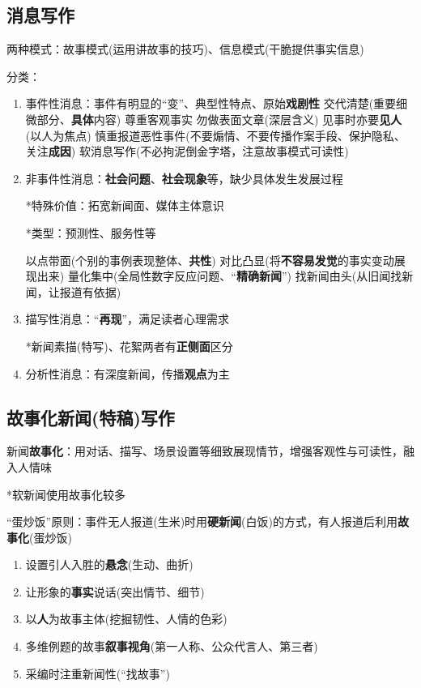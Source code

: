 \documentclass[a4paper,UTF8]{ctexart}
\begin{document}
\subsection{消息写作}

两种模式：故事模式(运用讲故事的技巧)、信息模式(干脆提供事实信息)

分类：
\begin{enumerate}
	\item 事件性消息：事件有明显的“变”、典型性特点、原始\textbf{戏剧性}
	\subitem 交代清楚(重要细微部分、\textbf{具体}内容)
	\subitem 尊重客观事实
	\subitem 勿做表面文章(深层含义)
	\subitem 见事时亦要\textbf{见人}(以人为焦点)
	\subitem 慎重报道恶性事件(不要煽情、不要传播作案手段、保护隐私、关注\textbf{成因})
	\subitem 软消息写作(不必拘泥倒金字塔，注意故事模式可读性)
	
	\item 非事件性消息：\textbf{社会问题}、\textbf{社会现象}等，缺少具体发生发展过程
	
	*特殊价值：拓宽新闻面、媒体主体意识
	
	*类型：预测性、服务性等
	
	\subitem 以点带面(个别的事例表现整体、\textbf{共性})
	\subitem 对比凸显(将\textbf{不容易发觉}的事实变动展现出来)
	\subitem 量化集中(全局性数字反应问题、“\textbf{精确新闻}”)
	\subitem 找新闻由头(从旧闻找新闻，让报道有依据)
	
	\item 描写性消息：“\textbf{再现}”，满足读者心理需求
	
	*新闻素描(特写)、花絮两者有\textbf{正侧面}区分
	
	\item 分析性消息：有深度新闻，传播\textbf{观点}为主
\end{enumerate}

\subsection{故事化新闻(特稿)写作}
新闻\textbf{故事化}：用对话、描写、场景设置等细致展现情节，增强客观性与可读性，融入人情味

*软新闻使用故事化较多

“蛋炒饭”原则：事件无人报道(生米)时用\textbf{硬新闻}(白饭)的方式，有人报道后利用\textbf{故事化}(蛋炒饭)

\begin{enumerate}
	\item 设置引人入胜的\textbf{悬念}(生动、曲折)
	\item 让形象的\textbf{事实}说话(突出情节、细节)
	\item 以\textbf{人}为故事主体(挖掘韧性、人情的色彩)
	\item 多维例题的故事\textbf{叙事视角}(第一人称、公众代言人、第三者)
	\item 采编时注重新闻性(“找故事”)
\end{enumerate}
\end{document}
